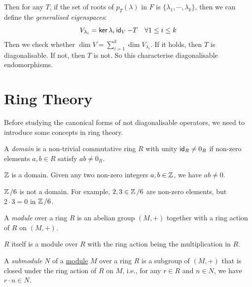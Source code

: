 Then for any $T$, if the set of roots of $p_T (\lambda)$ in $F$ is $\{ \lambda_1, \cdots, \lambda_k \}$, then we can define the \emph{generalised eigenspaces}:
\[
  V_{\lambda_i} = \operatorname{\text{\normalfont\sffamily ker}}{\lambda_i \operatorname{\text{\normalfont\sffamily id}}_V - T} \quad \forall 1 \leq i \leq k
\]
Then we check whether $\dim V = \sum_{i = 1}^k \dim V_{\lambda_i}$. If it holds, then $T$ is diagonalisable. If not, then $T$ is not. So this characterise diagonalisable endomorphisms.

\section{Ring Theory}

Before studying the canonical forms of not diagonalisable operators, we need to introduce some concepts in ring theory.

\begin{definition}[Domain]\label{def:domain}
  A \emph{domain} is a non-trivial commutative ring $R$ with unity $\operatorname{\text{\normalfont\sffamily id}}_R \neq 0_R$ if non-zero elements $a, b \in R$ satisfy $ab \neq 0_R$.
\end{definition}

\begin{example}
  $\operatorname{\mathbb{Z}}$ is a domain. Given any two non-zero integers $a, b \in \operatorname{\mathbb{Z}}$, we have $ab \neq 0$.
\end{example}

\begin{example}
  $\operatorname{\mathbb{Z}} \mathbin{/} 6$ is not a domain. For example, $2, 3 \in \operatorname{\mathbb{Z}} \mathbin{/} 6$ are non-zero elements, but $2 \cdot 3 = 0$ in $\operatorname{\mathbb{Z}} \mathbin{/} 6$.
\end{example}

\begin{definition}[Module]\label{def:module}
  A \emph{module} over a ring $R$ is an abelian group $(M, +)$ together with a ring action of $R$ on $(M, +)$.
\end{definition}

\begin{example}
  $R$ itself is a module over $R$ with the ring action being the multiplication in $R$.
\end{example}

\begin{definition}[Submodule]\label{def:submodule}
  A \emph{submodule} $N$ of a \hyperref[def:module]{module} $M$ over a ring $R$ is a subgroup of $(M, +)$ that is closed under the ring action of $R$ on $M$, i.e., for any $r \in R$ and $n \in N$, we have $r \cdot n \in N$.
\end{definition}

